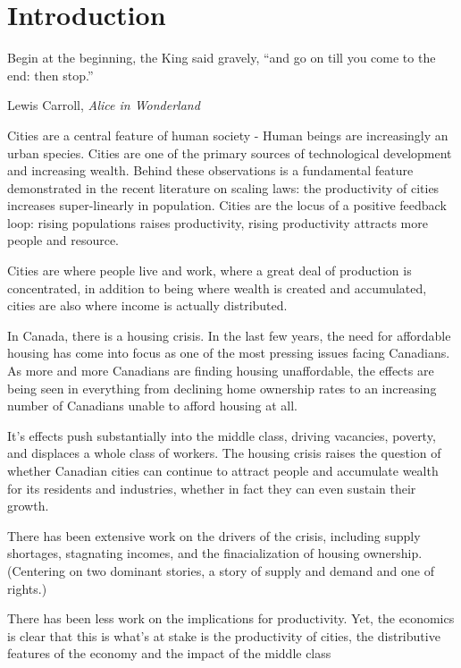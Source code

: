 \chapter{Introduction}

\epigraph{Begin at the beginning, the King said gravely, ``and go on till you come to the end: then stop.''}{Lewis Carroll, \textit{Alice in Wonderland}}

Cities are a central feature of human society - Human beings are increasingly an urban species. Cities are one of the primary sources of technological development and increasing wealth. Behind these observations is a fundamental feature demonstrated in the recent literature on scaling laws: the productivity of cities increases super-linearly in population. Cities are the locus of a positive feedback loop: rising populations raises productivity, rising productivity attracts more people and resource.

Cities are where people live and work, where a great deal of production is concentrated, in addition to being where wealth is created and accumulated, cities are also where income is actually distributed. 

In Canada, there is a housing crisis. In the last few years, the need for affordable housing has come into focus as one of the most pressing issues facing Canadians. As more and more Canadians are finding housing unaffordable, the effects are being seen in everything from declining home ownership rates to an increasing number of Canadians unable to afford housing at all.

It's effects push substantially into the middle class, driving vacancies, poverty, and displaces a whole class of workers.
The housing crisis raises the question of whether Canadian cities can continue to attract people and accumulate wealth for its residents and industries, whether in fact they can even sustain their growth.

There has been extensive work on the drivers of the crisis, including supply shortages, stagnating incomes, and the finacialization of housing ownership.
(Centering on two dominant stories, a story of supply and demand and one of rights.) %

There has been less work on the implications for productivity. 
Yet, the economics is clear that this is what's at stake is the productivity of cities, the distributive features of the economy and the impact of the middle class %

